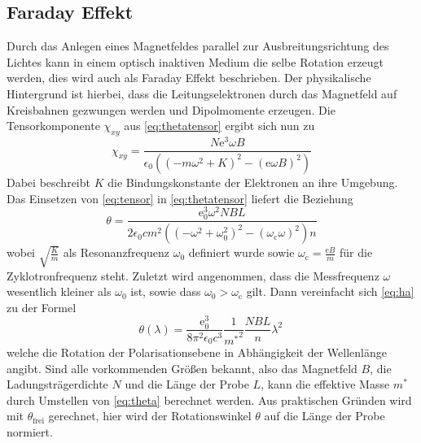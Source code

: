 \subsection{Faraday Effekt}

Durch das Anlegen eines Magnetfeldes parallel zur Ausbreitungsrichtung des Lichtes kann in einem optisch inaktiven Medium die selbe Rotation erzeugt werden, dies
wird auch als Faraday Effekt beschrieben. Der physikalische Hintergrund ist hierbei, dass die Leitungselektronen durch das Magnetfeld auf Kreisbahnen
gezwungen werden und Dipolmomente erzeugen.
Die Tensorkomponente $\chi_{xy}$ aus \autoref{eq:thetatensor} ergibt sich nun zu
\begin{equation}
    \chi_{xy} = \frac{N\text{e}^3\omega B}{\epsilon_0\left(\left(-m\omega^2+K\right)^2-\left(\text{e}\omega B\right)^2\right)}
    \label{eq:tensor}
\end{equation}
Dabei beschreibt $K$ die Bindungskonstante der Elektronen an ihre Umgebung.
Das Einsetzen von \autoref{eq:tensor} in \autoref{eq:thetatensor} liefert die Beziehung
\begin{equation}
    \theta=\frac{\text{e}_0^3\omega^2NBL}{2\epsilon_0cm^2\left(\left(-\omega^2+\omega_0^2\right)^2-\left(\omega_{\text{c}}\omega\right)^2\right)n}
    \label{eq:ha}
\end{equation}
wobei $\sqrt{\frac{K}{m}}$ als Resonanzfrequenz $\omega_0$ definiert wurde sowie $\omega_{\text{c}} = \frac{\text{e}B}{m}$ für die Zyklotronfrequenz steht.
Zuletzt wird angenommen, dass die Messfrequenz $\omega$ wesentlich kleiner als $\omega_0$ ist, sowie dass $\omega_0>\omega_{\text{c}}$ gilt. Dann vereinfacht
sich \autoref{eq:ha} zu der Formel
\begin{equation}
    \theta(\lambda)=\frac{\text{e}_0^3}{8\pi^2\epsilon_0c^3}\frac{1}{{m^*}^2}\frac{NBL}{n}\lambda^2\,
    \label{eq:theta}
\end{equation}
welche die Rotation der Polarisationsebene in Abhängigkeit der Wellenlänge angibt.
Sind alle vorkommenden Größen bekannt, also das Magnetfeld $B$, die Ladungsträgerdichte $N$ und die Länge der Probe $L$, kann die effektive Masse
$m^*$ durch Umstellen von \autoref{eq:theta} berechnet werden.
Aus praktischen Gründen wird mit $\theta_\text{frei}$ gerechnet, hier wird der Rotationswinkel $\theta$ auf die Länge der Probe normiert.